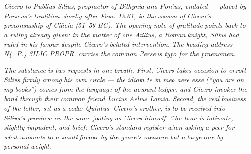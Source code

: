 
\textit{Cicero to Publius Silius, propraetor of Bithynia and
Pontus, undated --- placed by Perseus's tradition shortly
after \textit{Fam.} 13.61, in the season of Cicero's
proconsulship of Cilicia (51--50 BC). The opening note of
gratitude points back to a ruling already given: in the
matter of one Atilius, a Roman knight, Silius had ruled in
his favour despite Cicero's belated intervention. The
heading address \textit{N(=P.) SILIO PROPR.} carries the
common Perseus typo for the praenomen.}

\textit{The substance is two requests in one breath. First,
Cicero takes occasion to enroll Silius firmly among his own
circle --- the idiom \textit{te in meo aere esse} (``you are
on my books'') comes from the language of the
account-ledger, and Cicero invokes the bond through their
common friend Lucius Aelius Lamia. Second, the real
business of the letter, set as a coda: Quintus, Cicero's
brother, is to be received into Silius's province on the
same footing as Cicero himself. The tone is intimate,
slightly impudent, and brief: Cicero's standard register
when asking a peer for what amounts to a small favour by
the genre's measure but a large one by personal weight.}
